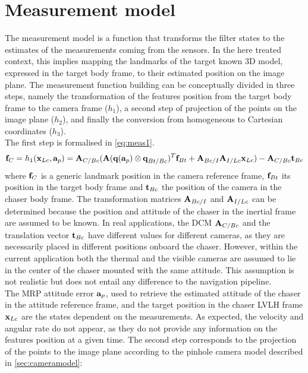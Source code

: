 \section{Measurement model}
\label{sec:mesmodel}
The measurement model is a function that transforms the filter states to the estimates of the measurements coming from the sensors. In the here treated context, this implies mapping the landmarks of the target known 3D model, expressed in the target body frame, to their estimated position on the image plane.
The measurement function building can be conceptually divided in three steps, namely the transformation of the features position from the target body frame to the camera frame ($h_1$), a second step of projection of the points on the image plane ($h_2$), and  finally the conversion from homogeneous to Cartesian coordinates ($h_3$). \\
The first step is formalised in \cref{eq:meas1}.
\begin{equation}
\label{eq:meas1}
    \mathrm{\textbf{f}}_C = h_1(\mathrm{\textbf{x}}_{Lc},\mathrm{\textbf{a}}_p) =\mathrm{\textbf{A}}_{C/Bc}(\mathrm{\textbf{A}}(\mathrm{\textbf{q}}(\mathrm{\textbf{a}}_p)\otimes\mathrm{\textbf{q}}_{Bt/Bc})^T\mathrm{\textbf{f}}_{Bt} + \mathrm{\textbf{A}}_{Bc/I}\mathrm{\textbf{A}}_{I/Lc}\mathrm{\textbf{x}}_{Lc}) - \mathrm{\textbf{A}}_{C/Bc}\mathrm{\textbf{t}}_{Bc}
\end{equation}
where $\mathrm{\textbf{f}}_C$ is a generic landmark position in the camera reference frame, $\mathrm{\textbf{f}}_{Bt}$ its position in the target body frame and $\mathrm{\textbf{t}}_{Bc}$ the position of the camera in the chaser body frame. The transformation matrices $\mathrm{\textbf{A}}_{Bc/I}$ and $\mathrm{\textbf{A}}_{I/Lc}$ can be determined because the position and attitude of the chaser in the inertial frame are assumed to be known. In real applications, the DCM $\mathrm{\textbf{A}}_{C/Bc}$ and the translation vector $\mathrm{\textbf{t}}_{Bc}$ have different values for different cameras, as they are necessarily placed in different positions onboard the chaser. However, within the current application both the thermal and the visible cameras are assumed to lie in the center of the chaser mounted with the same attitude. This assumption is not realistic but does not entail any difference to the navigation pipeline. \\
The MRP attitude error $\mathrm{\textbf{a}}_p$, used to retrieve the estimated attitude of the chaser in the attitude reference frame, and the target position in the chaser LVLH frame $\mathrm{\textbf{x}}_{Lc}$ are the states dependent on the measurements. As expected, the velocity and angular rate do not appear, as they do not provide any information on the features position at a given time. 
The second step corresponds to the projection of the points to the image plane according to the pinhole camera model described in \cref{sec:cameramodel}:
